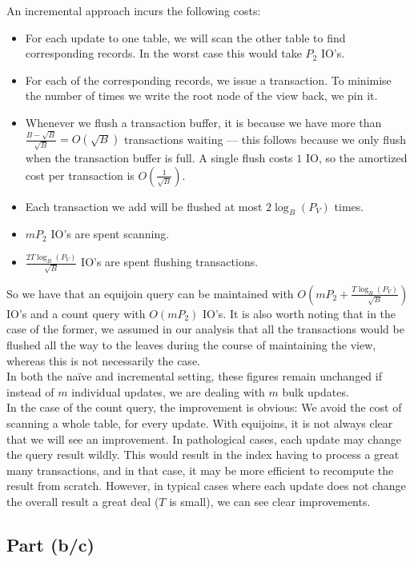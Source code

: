 An incremental approach incurs the following costs:
\begin{itemize}
  \item For each update to one table, we will scan the other table to find corresponding records. In the worst case this would take $P_2$ IO's.
  \item For each of the corresponding records, we issue a transaction. To minimise the number of times we write the root node of the view back, we pin it.
  \item Whenever we flush a transaction buffer, it is because we have more than $\frac{B - \sqrt{B}}{\sqrt{B}}=O(\sqrt{B})$ transactions waiting --- this follows because we only flush when the transaction buffer is full. A single flush costs $1$ IO, so the amortized cost per transaction is $O(\frac{1}{\sqrt{B}})$.
  \item Each transaction we add will be flushed at most $2\log_B(P_V)$ times.
  \item $mP_2$ IO's are spent scanning.
  \item $\frac{2T\log_B(P_V)}{\sqrt{B}}$ IO's are spent flushing transactions.
\end{itemize}

So we have that an equijoin query can be maintained with ${O(mP_2 + \frac{T\log_B(P_V)}{\sqrt{B}})}$ IO's and a count query with $O(mP_2)$ IO's. It is also worth noting that in the case of the former, we assumed in our analysis that all the transactions would be flushed all the way to the leaves during the course of maintaining the view, whereas this is not necessarily the case.\\[1em]

In both the na\"ive and incremental setting, these figures remain unchanged if instead of $m$ individual updates, we are dealing with $m$ bulk updates.\\[1em]

In the case of the count query, the improvement is obvious: We avoid the cost of scanning a whole table, for every update. With equijoins, it is not always clear that we will see an improvement. In pathological cases, each update may change the query result wildly. This would result in the index having to process a great many transactions, and in that case, it may be more efficient to recompute the result from scratch. However, in typical cases where each update does not change the overall result a great deal ($T$ is small), we can see clear improvements.

\subsection{Part (b/c)}\label{sec:q-1-b}

